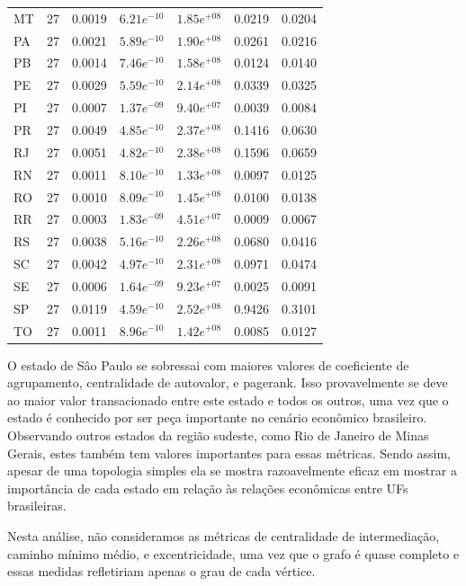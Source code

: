 \begin{table}[htb]
\begin{tabular}{l|rrrrrr}
    MT & 27 & 0.0019 & $6.21e^{-10}$ & $1.85e^{+08}$ & 0.0219 & 0.0204 \\
    PA & 27 & 0.0021 & $5.89e^{-10}$ & $1.90e^{+08}$ & 0.0261 & 0.0216 \\
    PB & 27 & 0.0014 & $7.46e^{-10}$ & $1.58e^{+08}$ & 0.0124 & 0.0140 \\
    PE & 27 & 0.0029 & $5.59e^{-10}$ & $2.14e^{+08}$ & 0.0339 & 0.0325 \\
    PI & 27 & 0.0007 & $1.37e^{-09}$ & $9.40e^{+07}$ & 0.0039 & 0.0084 \\
    PR & 27 & 0.0049 & $4.85e^{-10}$ & $2.37e^{+08}$ & 0.1416 & 0.0630 \\
    RJ & 27 & 0.0051 & $4.82e^{-10}$ & $2.38e^{+08}$ & 0.1596 & 0.0659 \\
    RN & 27 & 0.0011 & $8.10e^{-10}$ & $1.33e^{+08}$ & 0.0097 & 0.0125 \\
    RO & 27 & 0.0010 & $8.09e^{-10}$ & $1.45e^{+08}$ & 0.0100 & 0.0138 \\
    RR & 27 & 0.0003 & $1.83e^{-09}$ & $4.51e^{+07}$ & 0.0009 & 0.0067 \\
    RS & 27 & 0.0038 & $5.16e^{-10}$ & $2.26e^{+08}$ & 0.0680 & 0.0416 \\
    SC & 27 & 0.0042 & $4.97e^{-10}$ & $2.31e^{+08}$ & 0.0971 & 0.0474 \\
    SE & 27 & 0.0006 & $1.64e^{-09}$ & $9.23e^{+07}$ & 0.0025 & 0.0091 \\
    SP & 27 & 0.0119 & $4.59e^{-10}$ & $2.52e^{+08}$ & 0.9426 & 0.3101 \\
    TO & 27 & 0.0011 & $8.96e^{-10}$ & $1.42e^{+08}$ & 0.0085 & 0.0127 \\
    \bottomrule
    \end{tabular}
\fdadospesquisa
\end{table}

O estado de Sâo Paulo se sobressai com maiores valores de coeficiente de agrupamento, centralidade de autovalor, e pagerank. Isso provavelmente se deve ao maior valor transacionado entre este estado e todos os outros, uma vez que o estado é conhecido por ser peça importante no cenário econômico brasileiro. Observando outros estados da região sudeste, como Rio de Janeiro de Minas Gerais, estes também tem valores importantes para essas métricas. Sendo assim, apesar de uma topologia simples ela se mostra razoavelmente eficaz em mostrar a importância de cada estado em relação às relações econômicas entre UFs brasileiras.

Nesta análise, não consideramos as métricas de centralidade de intermediação, caminho mínimo médio, e excentricidade, uma vez que o grafo é quase completo e essas medidas refletiriam apenas o grau de cada vértice.

